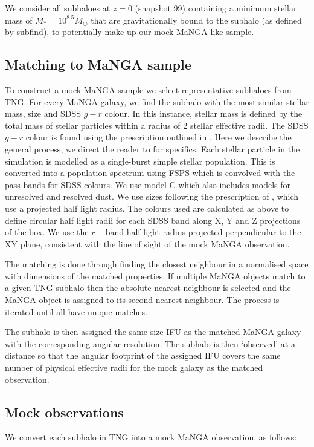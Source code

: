 \documentclass[fleqn,usenatbib]{mnras}
\begin{document}
We consider all subhaloes at $z=0$ (snapshot 99) containing a minimum stellar mass of $M_{\ast} = 10^{8.5} M_{\odot}$ that are gravitationally bound to the subhalo (as defined by subfind), to potentially make up our mock MaNGA like sample. 

\subsection{Matching to MaNGA sample}
To construct a mock MaNGA sample we select representative subhaloes from TNG. For every MaNGA galaxy, we find the subhalo with the most similar stellar mass, size and SDSS $g - r$ colour. In this instance, stellar mass is defined by the total mass of stellar particles within a radius of 2 stellar effective radii. The SDSS $g - r$ colour is found using the prescription outlined in \citet{nelson18}. Here we describe the general process, we direct the reader to \citet{nelson18} for specifics. Each stellar particle in the simulation is modelled as a single-burst simple stellar population. This is converted into a population spectrum using FSPS \citep{conroy2009,conroy2010,foreman_mackey2014} which is convolved with the pass-bands for SDSS colours. We use model C \citep[as described in][]{nelson18} which also includes models for unresolved and resolved dust. We use sizes following the prescription of \citet{genel2018}, which use a projected half light radius. The colours used are calculated as above to define circular half light radii for each SDSS band along X, Y and Z projections of the box. We use the $r-$band half light radius projected perpendicular to the XY plane, consistent with the line of sight of the mock MaNGA observation.

The matching is done through finding the closest neighbour in a normalised space with dimensions of the matched properties. If multiple MaNGA objects match to a given TNG subhalo then the absolute nearest neighbour is selected and the MaNGA object is assigned to its second nearest neighbour. The process is iterated until all have unique matches. 

The subhalo is then assigned the same size IFU as the matched MaNGA galaxy with the corresponding angular resolution. The subhalo is then `observed' at a distance so that the angular footprint of the assigned IFU covers the same number of physical effective radii for the mock galaxy as the matched observation. 

\subsection{Mock observations}
We convert each subhalo in TNG into a mock MaNGA observation, as follows:
\end{document}
